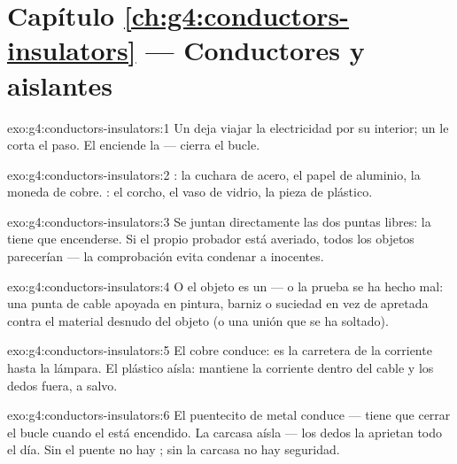 \section*{Capítulo \ref{ch:g4:conductors-insulators} --- Conductores y aislantes}

\begin{solution}{exo:g4:conductors-insulators:1}
Un  deja viajar la electricidad por su interior; un
 le corta el paso. El  enciende la
 --- cierra el bucle.
\end{solution}

\begin{solution}{exo:g4:conductors-insulators:2}
: la cuchara de acero, el papel de aluminio, la moneda
de cobre. : el corcho, el vaso de vidrio, la pieza de
plástico.
\end{solution}

\begin{solution}{exo:g4:conductors-insulators:3}
Se juntan directamente las dos puntas libres: la  tiene que
encenderse. Si el propio probador está averiado, todos los objetos
parecerían  --- la comprobación evita condenar a
inocentes.
\end{solution}

\begin{solution}{exo:g4:conductors-insulators:4}
O el objeto es un  --- o la prueba se ha hecho mal: una punta
de cable apoyada en pintura, barniz o suciedad en vez de apretada
contra el material desnudo del objeto (o una unión que se ha soltado).
\end{solution}

\begin{solution}{exo:g4:conductors-insulators:5}
El cobre conduce: es la carretera de la corriente hasta la lámpara. El
plástico aísla: mantiene la corriente dentro del cable y los dedos
fuera, a salvo.
\end{solution}

\begin{solution}{exo:g4:conductors-insulators:6}
El puentecito de metal conduce --- tiene que cerrar el bucle cuando el
 está encendido. La carcasa aísla --- los dedos la
aprietan todo el día. Sin el puente no hay ; sin la carcasa no
hay seguridad.
\end{solution}

